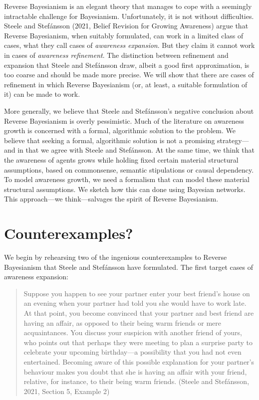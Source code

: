 \documentclass[
  11pt,
  dvipsnames,enabledeprecatedfontcommands]{scrartcl}
\begin{document}
Reverse Bayesianism is an elegant theory that manages to cope with a
seemingly intractable challenge for Bayesianism. Unfortunately, it is
not without difficulties. Steele and Stefánsson (2021, Belief Revision
for Growing Awareness) argue that Reverse Bayesianism, when suitably
formulated, can work in a limited class of cases, what they call cases
of \textit{awareness expansion}. But they claim it cannot work in cases
of \textit{awareness refinement}. The distinction between refinement and
expansion that Steele and Stefánsson draw, albeit a good first
approximation, is too coarse and should be made more precise. We will
show that there are cases of refinement in which Reverse Bayesianism
(or, at least, a suitable formulation of it) can be made to work.

More generally, we believe that Steele and Stefánsson's negative
conclusion about Reverse Bayesianism is overly pessimistic. Much of the
literature on awareness growth is concerned with a formal, algorithmic
solution to the problem. We believe that seeking a formal, algorithmic
solution is not a promising strategy---and in that we agree with Steele
and Stefánsson. At the same time, we think that the awareness of agents
grows while holding fixed certain material structural assumptions, based
on commonsense, semantic stipulations or causal dependency. To model
awareness growth, we need a formalism that can model these material
structural assumptions. We sketch how this can done using Bayesian
networks. This approach---we think---salvages the spirit of Reverse
Bayesianism.

\hypertarget{counterexamples}{%
\section{Counterexamples?}\label{counterexamples}}

We begin by rehearsing two of the ingenious counterexamples to Reverse
Bayesianism that Steele and Stefánsson have formulated. The first target
cases of awareness expansion:

\begin{quote}
Suppose you happen to see your partner enter your best friend's house on
an evening when your partner had told you she would have to work late.
At that point, you become convinced that your partner and best friend
are having an affair, as opposed to their being warm friends or mere
acquaintances. You discuss your suspicion with another friend of yours,
who points out that perhaps they were meeting to plan a surprise party
to celebrate your upcoming birthday---a possibility that you had not
even entertained. Becoming aware of this possible explanation for your
partner's behaviour makes you doubt that she is having an affair with
your friend, relative, for instance, to their being warm friends.
(Steele and Stefánsson, 2021, Section 5, Example 2)
\end{quote}
\end{document}
